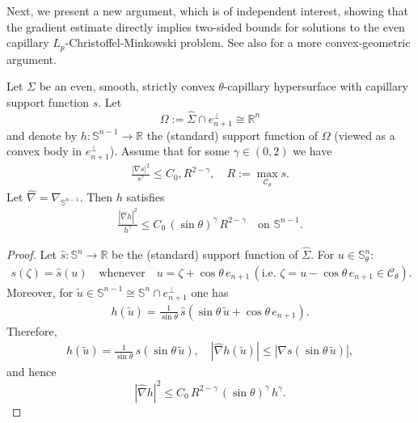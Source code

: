 \documentclass[12pt]{amsart}
\numberwithin{equation}{section}
\newcommand{\wh}{\widehat}
\newcommand{\bbR}{\mathbb{R}}
\newcommand{\bbS}{\mathbb{S}}
\newcommand{\8}{\infty}
\newcommand{\cC}{\mathcal{C}}
\newcommand{\eq}[1]{\begin{equation}\begin{alignedat}{2}#1\end{alignedat}\end{equation}}
\begin{document}
Next, we present a new argument, which is of independent interest, showing that the gradient estimate directly implies two-sided bounds for solutions to the even capillary $L_p$-Christoffel-Minkowski problem. See also \cite{HI25b} for a more convex-geometric argument.

\begin{lemma}\label{lem:grad-base}
Let $\Sigma$ be an even, smooth, strictly convex $\theta$-capillary hypersurface with capillary support function $s$. Let
\[
\Omega:=\widehat{\Sigma}\cap e_{n+1}^\perp\cong\bbR^n
\]
and denote by $h:\bbS^{n-1}\to\bbR$ the (standard) support function of $\Omega$
(viewed as a convex body in $e_{n+1}^\perp$).
Assume that for some $\gamma\in(0,2)$ we have
\eq{\label{eq:cap-grad}
\frac{|\nabla s|^2}{s^\gamma}\le C_0,R^{2-\gamma},
\quad
R:=\max_{\cC_\theta}s.
}
Let $\wh{\nabla}=\nabla_{\bbS^{n-1}}$. Then $h$ satisfies
\eq{\label{eq:base-grad}
\frac{|\wh{\nabla}h|^2}{h^\gamma}
\le C_0\,(\sin\theta)^{\gamma}\,R^{2-\gamma} \quad  \text{on } \bbS^{n-1}.
}
\end{lemma}

\begin{proof}
Let $\hat{s}:\bbS^n\to\bbR$ be the (standard) support function of $\widehat{\Sigma}$.
For $u\in\bbS^n_\theta$:
\eq{
s(\zeta)=\hat{s}(u)
\quad\text{whenever}\quad
u=\zeta+\cos\theta\,e_{n+1}
\, (\text{i.e.\ }\zeta=u-\cos\theta\,e_{n+1}\in\cC_\theta).
}
Moreover, for $\tilde u\in\bbS^{n-1}\cong \bbS^n\cap e_{n+1}^\perp$ one has
\eq{\label{eq:omega-support}
h(\tilde u)
=
\frac{1}{\sin\theta}\,\hat{s}(\sin\theta\,\tilde u+\cos\theta\,e_{n+1}).
}
Therefore,
\eq{\label{eq:omega-support-via-s}
h(\tilde u)
=
\frac{1}{\sin\theta}\,s(\sin\theta\,\tilde u), \quad
|\wh{\nabla}h(\tilde u)|
\le
|\nabla s(\sin\theta\,\tilde u)|,
}
and hence
\[
|\wh{\nabla}h|^2
\le
C_0\,R^{2-\gamma}\,(\sin\theta)^\gamma\,h^\gamma.
\]
\end{proof}
\end{document}
